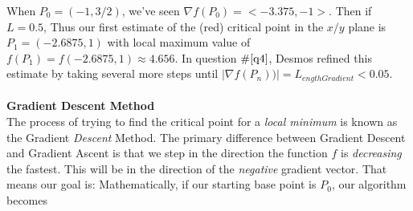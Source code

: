 \documentclass[11pt]{article}
\begin{document}
\example When $P_0=(-1,3/2)$,  we've seen $\nabla f(P_0)=<-3.375,-1>$.  Then if $L=0.5$, 
Thus our first estimate of the (red) critical point in the $x/y$ plane is  $P_1=(-2.6875, 1)$ with  local maximum value of $f(P_1)=f(-2.6875, 1)\approx 4.656$. In question $\#\ref{q4}$, Desmos refined this estimate by taking several more steps until $|\nabla f(P_n))|=L_{engthGradient}<0.05$.
\\\\
{\bf  Gradient Descent Method}\\
The process of trying to find the critical point for a {\em local minimum} is known as the Gradient {\em  Descent} Method.  The primary difference between Gradient Descent and Gradient Ascent is that we step in the direction the function $f$ is {\em decreasing} the fastest. This will be in the  direction of the {\em negative} gradient vector. That means our goal is:
Mathematically, if our starting base point is $P_0$, our algorithm becomes
\end{document}
